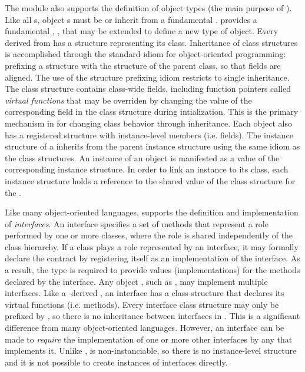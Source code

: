 \documentclass[article,shortnames]{jss}
\begin{document}
The  module also supports the definition of object types
(the main purpose of ). Like all s, object
s must be or inherit from a fundamental .
 provides a fundamental , ,
that may be extended to define a new type of object. Every
 derived from  has a  structure
representing its class. Inheritance of class structures is
accomplished through the standard  idiom for
object-oriented programming: prefixing a structure with the structure
of the parent class, so that fields are aligned. The use of the
structure prefixing idiom restricts  to single
inheritance. The class structure contains class-wide fields, including
function pointers called \emph{virtual functions} that may be
overriden by changing the value of the corresponding field in the
class structure during intialization. This is the primary mechanism in
 for changing class
behavior through inheritance. Each object  also has a
registered structure with instance-level members (i.e. fields). The
instance structure of a  inherits from the parent instance
structure using the same idiom as the class structures. An instance of
an object  is manifested as a value of the corresponding
instance structure. In order to link an instance to its class, each
instance structure holds a reference to the shared value of the class
structure for the .

Like many object-oriented languages,  supports the
definition and implementation of \emph{interfaces}. An interface
specifies a set of methods that represent a role performed by one or
more classes, where the role is shared independently of the class
hierarchy. If a class plays a role represented by an interface, it may
formally declare the contract by registering itself as an
implementation of the interface. As a result, the type is required to
provide values (implementations) for the methods declared by the
interface. Any object , such as ,
may implement multiple interfaces. Like a -derived
, an interface has a class structure that declares its
virtual functions (i.e. methods). Every interface class structure may
only be prefixed by , so there is no inheritance
between interfaces in . This is a significant difference
from many object-oriented languages. However, an interface can be made
to \emph{require} the implementation of one or more other interfaces
by any  that implements it. Unlike ,
 is non-instanciable, so there is no
instance-level structure and it is not possible to create instances of
interfaces directly.
\end{document}
